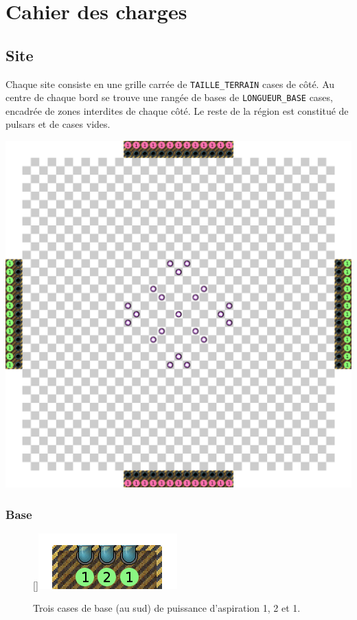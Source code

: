 \section{Cahier des charges}\label{cahier-des-charges}

\subsection{Site}\label{site}

Chaque site consiste en une grille carrée de \texttt{TAILLE\_TERRAIN}
cases de côté. Au centre de chaque bord se trouve une rangée de bases de
\texttt{LONGUEUR\_BASE} cases, encadrée de zones interdites de chaque
côté. Le reste de la région est constitué de pulsars et de cases vides.

\noindent\includegraphics[width=\textwidth]{asset/site.png}

\subsubsection{Base}\label{base}

\begin{figure}
    \centering
    \raisebox{0pt}[\dimexpr{}\baselineskip\relax]{\includegraphics{asset/base.png}}
    \caption*{Trois cases de base (au sud) de puissance d'aspiration 1, 2 et 1.}
\end{figure}

